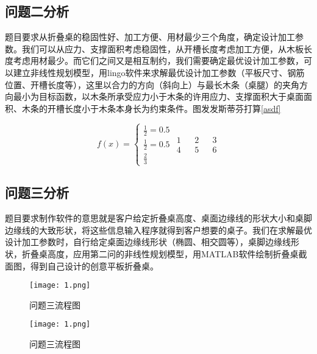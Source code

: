 \documentclass[bwprint]{gmcmthesis}
\begin{document}
\subsection{问题二分析}
题目要求从折叠桌的稳固性好、加工方便、用材最少三个角度，确定设计加工参数。我们可以从应力、支撑面积考虑稳固性，从开槽长度考虑加工方便，从木板长度考虑用材最少。而它们之间又是相互制约，我们需要确定最优设计加工参数，可以建立非线性规划模型，用lingo软件来求解最优设计加工参数（平板尺寸、钢筋位置、开槽长度等），这里以合力的方向（斜向上）与最长木条（桌腿）的夹角方向最小为目标函数，以木条所承受应力小于木条的许用应力、支撑面积大于桌面面积、木条的开槽长度小于木条本身长为约束条件。图发发斯蒂芬打算\ref{asdf}

\begin{equation}
    f(x) = \begin{cases}
        \frac{1}{2} = 0.5 \\
        \frac{1}{2} = 0.5 \\
        \frac{2}{3}
    \end{cases}\label{asdf}
    \begin{matrix}
        1 && 2 && 3 \\
        4 && 5 && 6
    \end{matrix}
\end{equation}

\subsection{问题三分析}
题目要求制作软件的意思就是客户给定折叠桌高度、桌面边缘线的形状大小和桌脚边缘线的大致形状，将这些信息输入程序就得到客户想要的桌子。我们在求解最优设计加工参数时，自行给定桌面边缘线形状（椭圆、相交圆等），桌脚边缘线形状，折叠桌高度，应用第二问的非线性规划模型，用MATLAB软件绘制折叠桌截面图，得到自己设计的创意平板折叠桌。

\begin{figure}[!htbp]
    \begin{minipage}{0.48\linewidth}
        \centering
        \texttt{[image: 1.png]}
        \caption{问题三流程图}\label{问题}
    \end{minipage}
    \begin{minipage}{0.48\linewidth}
        \centering
        \texttt{[image: 1.png]}
        \caption{问题三流程图}\label{wenti4}
    \end{minipage}
\end{figure}

\newpage
\quad
\newpage
\end{document}
